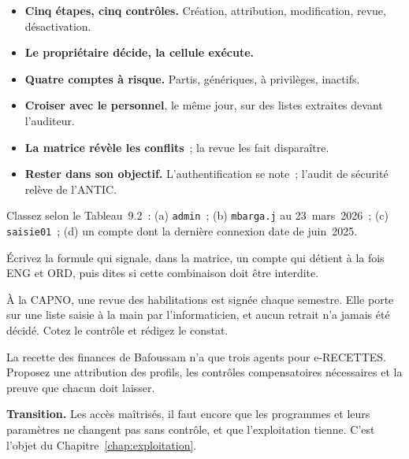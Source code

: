 \separateur

\begin{boxresume}
\begin{itemize}
    \item \textbf{Cinq étapes, cinq contrôles.} Création, attribution,
          modification, revue, désactivation.
    \item \textbf{Le propriétaire décide, la cellule exécute.}
    \item \textbf{Quatre comptes à risque.} Partis, génériques, à
          privilèges, inactifs.
    \item \textbf{Croiser avec le personnel}, le même jour, sur des listes
          extraites devant l'auditeur.
    \item \textbf{La matrice révèle les conflits}~; la revue les fait
          disparaître.
    \item \textbf{Rester dans son objectif.} L'authentification se note~;
          l'audit de sécurité relève de l'ANTIC.
\end{itemize}
\end{boxresume}

\begin{boxexo}[title={\ding{45}\quad Exercice~9.1. Classer les comptes \niveaubase}]
Classez selon le Tableau~9.2~: (a) \texttt{admin}~; (b) \texttt{mbarga.j}
au 23~mars~2026~; (c) \texttt{saisie01}~; (d) un compte dont la dernière
connexion date de juin~2025.
\end{boxexo}

\begin{boxexo}[title={\ding{45}\quad Exercice~9.2. Une formule \niveaubase}]
Écrivez la formule qui signale, dans la matrice, un compte qui détient à
la fois ENG et ORD, puis dites si cette combinaison doit être interdite.
\end{boxexo}

\begin{boxexo}[title={\ding{45}\quad Exercice~9.3. La revue qui ne sert à rien \niveaumoyen}]
À la CAPNO, une revue des habilitations est signée chaque semestre. Elle
porte sur une liste saisie à la main par l'informaticien, et aucun retrait
n'a jamais été décidé. Cotez le contrôle et rédigez le constat.
\end{boxexo}

\begin{boxexo}[title={\ding{45}\quad Exercice~9.4. Un petit service \niveauexpert}]
La recette des finances de Bafoussam n'a que trois agents pour
e-RECETTES. Proposez une attribution des profils, les contrôles
compensatoires nécessaires et la preuve que chacun doit laisser.
\end{boxexo}

\begin{boxinfo}
\textbf{Transition.} Les accès maîtrisés, il faut encore que les
programmes et leurs paramètres ne changent pas sans contrôle, et que
l'exploitation tienne. C'est l'objet du Chapitre~\ref{chap:exploitation}.
\end{boxinfo}
